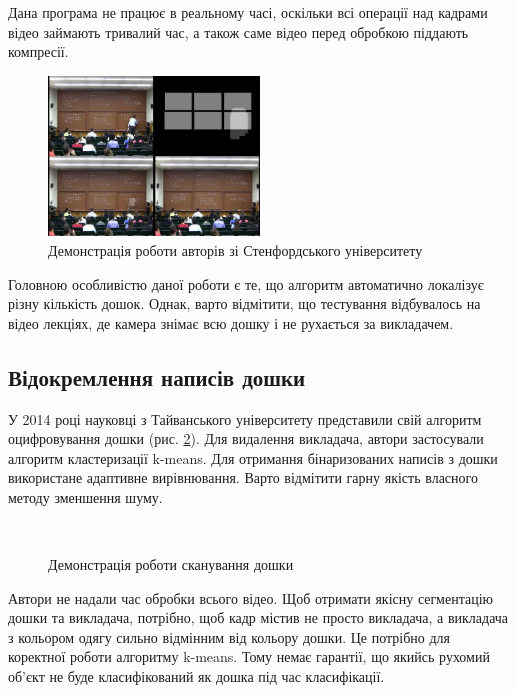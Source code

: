 Дана програма не працює в реальному часі, оскільки всі операції над кадрами
відео займають тривалий час, а також саме відео перед обробкою
піддають компресії.
\begin{figure}[H]
  \centering
  \includegraphics[width=0.5\textwidth]{images/suh}
  \caption{Демонстрація роботи авторів зі Стенфордського університету \cite{suh}
    \label{fig:suh}
  }
\end{figure}
Головною особливістю даної роботи є те, що  алгоритм автоматично локалізує
різну кількість дошок. Однак, варто відмітити, що тестування відбувалось на
відео лекціях, де камера знімає всю дошку і не рухається за викладачем.

\subsection{Відокремлення написів дошки}
У 2014 році науковці з Тайванського університету представили свій алгоритм \cite{yeh}
оцифровування дошки (рис. \ref{fig:yeh}). Для видалення викладача, автори застосували
алгоритм кластеризації k-means. Для отримання бінаризованих написів з дошки
використане адаптивне вирівнювання. Варто відмітити гарну
якість власного методу зменшення шуму.
\begin{figure}[H]
  \centering
  \\
  \caption{Демонстрація роботи сканування дошки \cite{yeh}
    \label{fig:yeh}
  }
\end{figure}
Автори не надали час обробки всього відео. Щоб отримати якісну сегментацію
дошки та викладача, потрібно, щоб кадр містив не просто викладача, а викладача з кольором одягу 
сильно відмінним від кольору дошки. Це потрібно для коректної роботи алгоритму k-means.
Тому немає гарантії, що якийсь рухомий об'єкт не буде класифікований як дошка під час класифікації.

